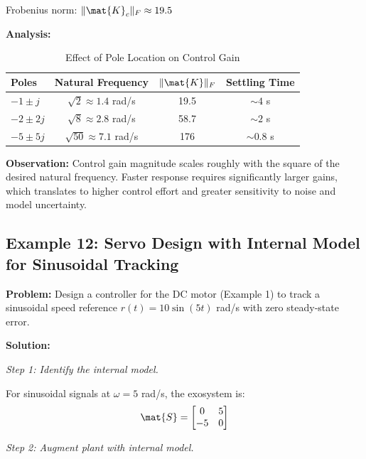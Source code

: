 Frobenius norm: $\|\mat{K}_c\|_F \approx 19.5$

\textbf{Analysis:}

\begin{table}[htbp]
\centering
\caption{Effect of Pole Location on Control Gain}
\begin{tabular}{lccc}
\toprule
\textbf{Poles} & \textbf{Natural Frequency} & \textbf{$\|\mat{K}\|_F$} & \textbf{Settling Time} \\
\midrule
$-1 \pm j$ & $\sqrt{2} \approx 1.4$ rad/s & 19.5 & $\sim 4$ s \\
$-2 \pm 2j$ & $\sqrt{8} \approx 2.8$ rad/s & 58.7 & $\sim 2$ s \\
$-5 \pm 5j$ & $\sqrt{50} \approx 7.1$ rad/s & 176 & $\sim 0.8$ s \\
\bottomrule
\end{tabular}
\end{table}

\textbf{Observation:} Control gain magnitude scales roughly with the square of the desired natural frequency. Faster response requires significantly larger gains, which translates to higher control effort and greater sensitivity to noise and model uncertainty.

\subsection{Example 12: Servo Design with Internal Model for Sinusoidal Tracking}

\textbf{Problem:} Design a controller for the DC motor (Example 1) to track a sinusoidal speed reference $r(t) = 10\sin(5t)$ rad/s with zero steady-state error.

\textbf{Solution:}

\textit{Step 1: Identify the internal model.}

For sinusoidal signals at $\omega = 5$ rad/s, the exosystem is:
\begin{equation}
\mat{S} = \begin{bmatrix} 0 & 5 \\ -5 & 0 \end{bmatrix}
\end{equation}

\textit{Step 2: Augment plant with internal model.}

